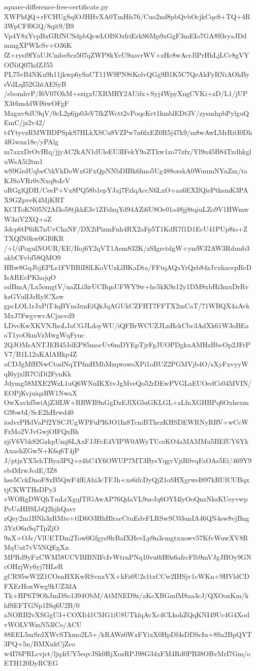 \documentclass[11pt]{article}
\theoremstyle{definition}
\theoremstyle{remark}
\begin{document}
\begin{filecontents*}[overwrite]{square-difference-free-certificate.py}
XWPhQQ+rFCHUgSqlOJHHvXA0TmHfs76/Cuo2nd8pbQvbOcjkCqeS+TQ+4R3WpCFf0GQ/8qit9/B9
Vp4Y8xYvpBxGRfNCSdpbQcwLOISOzfriErkS6Mp9xGgF3mEIo7GA893ryaJDdmmgXPWIcSv+O36K
fZ+rysi9fYaUJCmbeScz507qZWP8kYeU9uavrWV+zHc8wAcrJlPrHhLjLCc8gVYOfNiQ07kdZJ55
PL75vB4NKu9h11jkwp6ySaCT11W9PN8tKelvQGg9B1K5C7QeAkFyRNiAOhByeVdLqI52GhtAESyB
/sbomhvP/I6V07OhM+szigxUXRMRY2AUifx+Syj4WpyXngCVKi+zD/L1/jUPX3t6mddWf8iwOFgF
Maguv8dU9qV/0cL2p6jp0JeV7fkZWctt2vPoqcKvt1kmblEDt3V/zysmhpbPylguQEmC/jz2v42/
t4YtyvzRMWBDPSpkS7HLkXSCu8VZPw7n6fxEZ0R5j47k9/m8wAwLMrRitI0Dh4fGwnz18e/yPAlg
m7axxDrOvIRq/jjyAC2kAN1dUleEU3IFekY9aZTkw1zo77zfx/Yl9u45B84TxdhkgluWsA5i2tm1
wS9GrdUqbeCtkVkDoWxGFxQpNNbDIBk6lmo5Ug488orskA0WuumNYnZm/taKJSoVRr0vNxq8oIcV
oRGglQDH/CeeP+Vx8PQ58b1epYJaj7FzlqAccN6LxO+aa6EXIlQiePtksmK3PAX9GZpveK4MjKRT
KCIToKN05N2Af3o58tjkhE3v1ZFslzqYd94AZi6U8Oc01o48jj8tqiuLZo9V1HWmwW3ziV2XQ+aZ
3dcp6tP6iK7nUvChzNF/DX2iPizmFnh4RX2aFp5T1KdR7f1D1EcU41PUp8io+ZTXQfN0kw0GI0KR
/+l/iPogulNOUR/EE/Ifoj6Y2qVT1Aem832K/zSIgrctdgW+ymW32AW3Rduub3akbCFvbf58QMO9
HRw8GqJbjEPLs1FVBRlI8lLKoVUzLlBKaDta/FFtqAQaYrQzb84zJvxhacepReDIsAREcPKhajqO
odBmA/Lx5omgtV/uaZLi3irUCBqnUFWY9w+hc5kK9z12y1DM8xbHi3mxDrRvkzGVulIJzRylCXsw
gpcLOL1rJxPiT4qBYm3xnEiQkJqAGUkCZFHT7FFTX2mCaT/71WBQX4aAvkMxJ7FwgvwvACjzevd9
LDvcKwXKVNJhoLJaCGJLdoyWU/iQFBrWCUZJLnHckCbc3AdXk61W3oBEaaT1yoOkmVzMwgWqFync
2QJOMsANTJEB45JdEP85mocUv6mDYEpTjrFgJUOPDgkuAMHzBbcOp2JFrPV7/B1L12aKAlAHkp4Z
aCDJgMfHNwCtudNqTPfmHMbMzqwawoXPi1oBUZ2PGMVjb4O/sXyFxvyyWqI6yjxlR7CiDi2FynKk
Jdymg58MXE2WzL1uQ6WNnIKXtvJgMveQo52rDEwPVGLaEUOedCs04MVIN/EOPjKvjuiqzRW1NwaX
OwXavhf5wiAjZ3fLW+RRWB9nGgDzEJlXGluGKLGL+zLfnXGHBPq6OxhexmG9bwbI/ScE2hHrwd40
iodvrPHdVaPf2YSCJUgWPFuPI6JO1In8TcniBThczKHSDEWRNyRRV+wCcWFzMo2VJvGwjOIFQxBh
zjiV6Vbk82GzkpUmj6LAxFJJFcE4VIPW0AWyTUceKO4aMAMMu5BEfUY6YkAxachZGwN+K6q6T4jP
J/ptjzYX5chTBya3PQ+z4hC4Y6OWUP7MT3BysYqgvVjiR0vqFaOAs5Ei/469Y9eb4MrwJcdE/IZ8
hse5CckDnoF8xB5QwF4fEAhi3cTFJh+xe6ifcDyQjZ1oSHXgrweI897kRUfCUBqxtjCKWTHsDPy3
vWORgDWQhTmLrXgqfTfGAwAP76QdaVL9ueJq6OYI4lyOoQnzNksKUeyvwpPeUaHBSLbQ2hjhQavr
zQey2m1BNh3zRMte+tlD6O3HhHlracCtuEdvFLRSwSC03unIA46QN4sw8vjBng3YxO6nSq7TpZjO
9nX+OJc/VlUETDm2Tow0Gfgys9lrBaIXHevLp9n3cmgtxuowv57KfvWuwXV8RMqUut7vV5NQEgXn
MPRd9yFxCWM58UCVBIBNIFcIvWtrnPNq10vu0iH0z6afrcFlb9mVJgJHOy9GNcOHzjWy6yj7HLeR
gCR95wW2Z1COsnHXKwRSvnxVX+kFz0U2s1txCCw2IHSjv1cWKn+9HVldCDFXErHoxWwg9kUZ3ilA
Tk+HP6T9OhJmDSo1394ObM/AtMNED9z/aKcXBGmfM8aa3cJ/QXOoxKm/khfSEFTGNp1ISq6U2B/0
aNORB2vXSGgU3+COXIi41CMG1iU8UTklqAvXc4CLkohZQqKNI49Uc4G4XodvWOLVWmN53lCo/ACU
88EEL5mSrdXWvSTkmo2L5+/kRAWz0WxFYixX0HpDf4sDDScIu+8Sa2BpQYT3PQ+5n/BMXnkCjZco
w4I76PRLcvjct/ljq4iUY5eqvJSk0RjXozRPJ98G34xFM4Rd0PB38OBvMrI7Gm/oETH120DyRCEG

\end{filecontents*}
\end{document}
